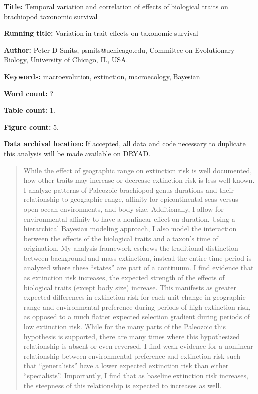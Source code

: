\documentclass{article}
\begin{document}
\linenumbers
\modulolinenumbers[2]


\begin{titlepage}
  \begin{large}
    \textbf{Title:} Temporal variation and correlation of effects of biological traits on brachiopod taxonomic survival
  \end{large}

  \textbf{Running title:} Variation in trait effects on taxonomic survival

  \textbf{Author:} Peter D Smits, psmits@uchicago.edu, Committee on Evolutionary Biology, University of Chicago, IL, USA.

  \textbf{Keywords:} macroevolution, extinction, macroecology, Bayesian

  \textbf{Word count:} ?
  
  \textbf{Table count:} 1.
 
  \textbf{Figure count:} 5.

  \textbf{Data archival location:} If accepted, all data and code necessary to duplicate this analysis will be made available on DRYAD.

\end{titlepage}

\begin{abstract}
  While the effect of geographic range on extinction risk is well documented, how other traits may increase or decrease extinction risk is less well known. I analyze patterns of Paleozoic brachiopod genus durations and their relationship to geographic range, affinity for epicontinental seas versus open ocean environments, and body size. Additionally, I allow for environmental affinity to have a nonlinear effect on duration. Using a hierarchical Bayesian modeling approach, I also model the interaction between the effects of the biological traits and a taxon's time of origination. My analysis framework eschews the traditional distinction between background and mass extinction, instead the entire time period is analyzed where these ``states'' are part of a continuum. I find evidence that as extinction risk increases, the expected strength of the effects of biological traits (except body size) increase. This manifests as greater expected differences in extinction risk for each unit change in geographic range and environmental preference during periods of high extinction risk, as opposed to a much flatter expected selection gradient during periods of low extinction risk. While for the many parts of the Paleozoic this hypothesis is supported, there are many times where this hypothesized relationship is absent or even reversed. I find weak evidence for a nonlinear relationship between environmental preference and extinction risk such that ``generalists'' have a lower expected extinction risk than either ``specialists''. Importantly, I find that as baseline extinction risk increases, the steepness of this relationship is expected to increases as well.
\end{abstract}
\end{document}
